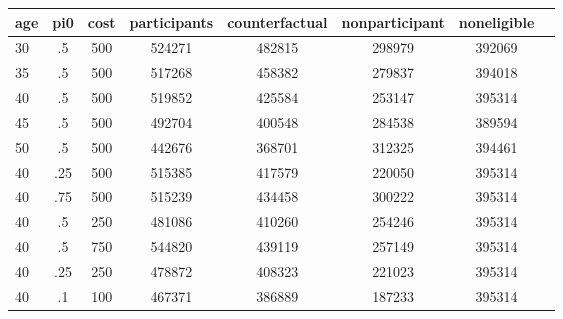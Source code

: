 \begin{table}[htbp]
\begin{tabular}{lccccccc} \hline \hline
 \multicolumn{1}{c}{ age }  & pi0  & cost  & participants  & counterfactual  & nonparticipant  & noneligible  \\  \hline 
       30 &        .5 &       500 &    524271 &    482815 &    298979 &    392069 \\  
       35 &        .5 &       500 &    517268 &    458382 &    279837 &    394018 \\  
       40 &        .5 &       500 &    519852 &    425584 &    253147 &    395314 \\  
       45 &        .5 &       500 &    492704 &    400548 &    284538 &    389594 \\  
       50 &        .5 &       500 &    442676 &    368701 &    312325 &    394461 \\  
       40 &       .25 &       500 &    515385 &    417579 &    220050 &    395314 \\  
       40 &       .75 &       500 &    515239 &    434458 &    300222 &    395314 \\  
       40 &        .5 &       250 &    481086 &    410260 &    254246 &    395314 \\  
       40 &        .5 &       750 &    544820 &    439119 &    257149 &    395314 \\  
       40 &       .25 &       250 &    478872 &    408323 &    221023 &    395314 \\  
       40 &        .1 &       100 &    467371 &    386889 &    187233 &    395314 \\  
\hline \hline \end{tabular}
\end{table}
